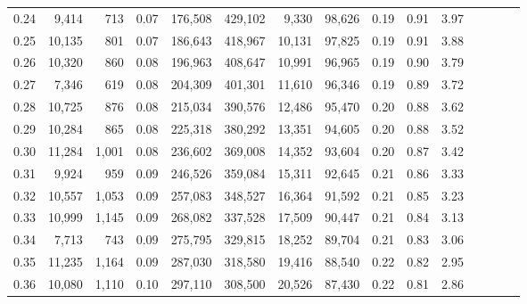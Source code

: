 \begin{tabular}{rrrcrrrrrrrrrrr}
0.24 &   9,414 &    713 &                                       0.07 &  176,508 &  429,102 &    9,330 &   98,626 &  0.19 &  0.91 &                         3.97 \\
0.25 &  10,135 &    801 &                                       0.07 &  186,643 &  418,967 &   10,131 &   97,825 &  0.19 &  0.91 &                         3.88 \\
0.26 &  10,320 &    860 &                                       0.08 &  196,963 &  408,647 &   10,991 &   96,965 &  0.19 &  0.90 &                         3.79 \\
0.27 &   7,346 &    619 &                                       0.08 &  204,309 &  401,301 &   11,610 &   96,346 &  0.19 &  0.89 &                         3.72 \\
0.28 &  10,725 &    876 &                                       0.08 &  215,034 &  390,576 &   12,486 &   95,470 &  0.20 &  0.88 &                         3.62 \\
0.29 &  10,284 &    865 &                                       0.08 &  225,318 &  380,292 &   13,351 &   94,605 &  0.20 &  0.88 &                         3.52 \\
0.30 &  11,284 &  1,001 &                                       0.08 &  236,602 &  369,008 &   14,352 &   93,604 &  0.20 &  0.87 &                         3.42 \\
0.31 &   9,924 &    959 &                                       0.09 &  246,526 &  359,084 &   15,311 &   92,645 &  0.21 &  0.86 &                         3.33 \\
0.32 &  10,557 &  1,053 &                                       0.09 &  257,083 &  348,527 &   16,364 &   91,592 &  0.21 &  0.85 &                         3.23 \\
0.33 &  10,999 &  1,145 &                                       0.09 &  268,082 &  337,528 &   17,509 &   90,447 &  0.21 &  0.84 &                         3.13 \\
0.34 &   7,713 &    743 &                                       0.09 &  275,795 &  329,815 &   18,252 &   89,704 &  0.21 &  0.83 &                         3.06 \\
0.35 &  11,235 &  1,164 &                                       0.09 &  287,030 &  318,580 &   19,416 &   88,540 &  0.22 &  0.82 &                         2.95 \\
0.36 &  10,080 &  1,110 &                                       0.10 &  297,110 &  308,500 &   20,526 &   87,430 &  0.22 &  0.81 &                         2.86 \\

\end{tabular}

